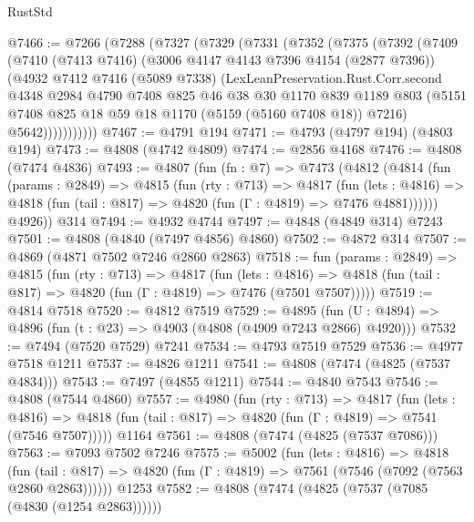 \begin{lexlean}{RustStd}
\begin{coremodule}
@7466 := @7266
    (@7288
      (@7327
        (@7329
          (@7331
            (@7352
              (@7375
                (@7392
                  (@7409
                    (@7410
                      (@7413 @7416)
                      (@3006 @4147 @4143 @7396 @4154 (@2877 @7396))
                      (@4932
                        @7412
                        @7416
                        (@5089 @7338)
                        (LexLeanPreservation.Rust.Corr.second
                          @4348
                          @2984
                          @4790
                          @7408
                          @825
                          @46
                          @38
                          @30
                          @1170
                          @839
                          @1189
                          @803
                          (@5151 @7408 @825 @18 @59 @18 @1170 (@5159 (@5160 @7408 @18)) @7216)
                          @5642)))))))))))
@7467 := @4791 @194
@7471 := @4793 (@4797 @194) (@4803 @194)
@7473 := @4808 (@4742 @4809)
@7474 := @2856 @4168
@7476 := @4808 (@7474 @4836)
@7493 := @4807
    (fun (fn : @7) =>
    @7473
      (@4812
        (@4814
          (fun (params : @2849) =>
          @4815
            (fun (rty : @713) =>
            @4817
              (fun (lets : @4816) =>
              @4818 (fun (tail : @817) => @4820 (fun (Γ : @4819) => @7476 @4881))))))
        @4926))
    @314
@7494 := @4932 @4744
@7497 := @4848 (@4849 @314) @7243
@7501 := @4808 (@4840 (@7497 @4856) @4860)
@7502 := @4872 @314
@7507 := @4869 (@4871 @7502 @7246 @2860 @2863)
@7518 := fun (params : @2849) =>
  @4815
    (fun (rty : @713) =>
    @4817
      (fun (lets : @4816) =>
      @4818 (fun (tail : @817) => @4820 (fun (Γ : @4819) => @7476 (@7501 @7507)))))
@7519 := @4814 @7518
@7520 := @4812 @7519
@7529 := @4895 (fun (U : @4894) => @4896 (fun (t : @23) => @4903 (@4808 (@4909 @7243 @2866) @4920)))
@7532 := @7494 (@7520 @7529) @7241
@7534 := @4793 @7519 @7529
@7536 := @4977 @7518 @1211
@7537 := @4826 @1211
@7541 := @4808 (@7474 (@4825 (@7537 @4834)))
@7543 := @7497 (@4855 @1211)
@7544 := @4840 @7543
@7546 := @4808 (@7544 @4860)
@7557 := @4980
    (fun (rty : @713) =>
    @4817
      (fun (lets : @4816) =>
      @4818 (fun (tail : @817) => @4820 (fun (Γ : @4819) => @7541 (@7546 @7507)))))
    @1164
@7561 := @4808 (@7474 (@4825 (@7537 @7086)))
@7563 := @7093 @7502 @7246
@7575 := @5002
    (fun (lets : @4816) =>
    @4818
      (fun (tail : @817) => @4820 (fun (Γ : @4819) => @7561 (@7546 (@7092 (@7563 @2860 @2863))))))
    @1253
@7582 := @4808 (@7474 (@4825 (@7537 (@7085 (@4830 (@1254 @2863))))))

\end{coremodule}
\end{lexlean}
